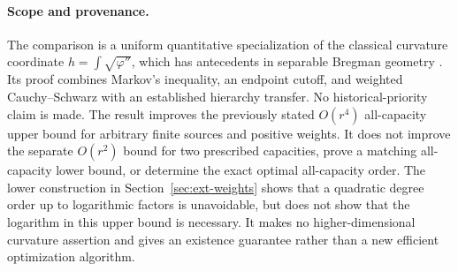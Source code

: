 \paragraph{Scope and provenance.}
The comparison is a uniform quantitative specialization of the classical
curvature coordinate $h=\int\sqrt{\varphi''}$, which has antecedents in
separable Bregman geometry \cite{gomes,gzyl}. Its proof combines Markov's
inequality, an endpoint cutoff, and weighted Cauchy--Schwarz with an
established hierarchy transfer. No historical-priority claim is made.
The result improves the previously stated $O(r^4)$ all-capacity upper bound
for arbitrary finite sources and positive weights. It does not improve the
separate $O(r^2)$ bound for two prescribed capacities, prove a matching
all-capacity lower bound, or determine the exact optimal all-capacity order.
The lower construction in Section~\ref{sec:ext-weights} shows that a
quadratic degree order up to logarithmic factors is unavoidable, but does
not show that the logarithm in this upper bound is necessary. It makes no higher-dimensional
curvature assertion and gives an existence guarantee rather than a new
efficient optimization algorithm.
